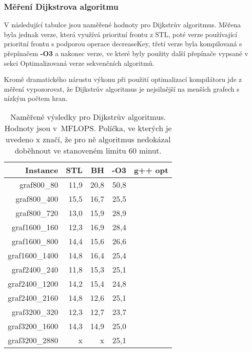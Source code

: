 \documentclass[a4paper,11pt]{article}
\begin{document}
\subsubsection{Měření Dijkstrova algoritmu}
V následující tabulce jsou naměřené hodnoty pro Dijkstrův algoritmus. Mě\-ře\-na byla jednak verze, která využívá prioritní frontu z STL, poté verze používající prioritní frontu s podporou operace decreaseKey, třetí verze byla kompilovaná s pře\-pí\-načem \textbf{-O3} a nakonec verze, ve které byly použity další pře\-pí\-nače vypsané v sekci Optimalizovaná verze sekvenčních algoritmů.
\par
Kromě dramatického nárustu výkonu při použití optimalizací kom\-pi\-látoru jde z měření vypozorovat, že Dijkstrův algoritmus je nejsilnější na menších grafech s nízkým počtem hran.
\begin{table}[H]
  \begin{center}
      \begin{tabular}{|r|r|r|r|r|}
      \hline
      Instance  	& STL	  & BH    & -O3	 & g++ opt  \\ \hline
      graf800\_80  	& 11,9  & 20,8	  & 50,8 &          \\ \hline
      graf800\_400     	& 15,5  & 16,7 	  & 25,5 &	    \\ \hline
      graf800\_720  	& 13,0  & 15,9 	  & 28,9 &	    \\ \hline
      graf1600\_160    	& 12,3  & 16,9 	  & 28,4 &	    \\ \hline
      graf1600\_800  	& 14,4  & 15,6 	  & 26,6 &	    \\ \hline
      graf1600\_1400   	& 14,8  & 16,4 	  & 25,4 &	    \\ \hline
      graf2400\_240  	& 11,8  & 15,3	  & 25,1 &          \\ \hline
      graf2400\_1200   	& 14,2  & 15,4	  & 24,8 &          \\ \hline
      graf2400\_2160  	& 14,8  & 12,6	  & 25,1 &          \\ \hline
      graf3200\_320    	& 12,3  & 12,7	  & 23,7 &          \\ \hline
      graf3200\_1600  	& 14,3  & 14,9	  & 25,0 &          \\ \hline
      graf3200\_2880   	& x    	& x 	  & 25,1 &          \\ \hline
      \end{tabular}
  \caption{Naměřené výsledky pro Dijkstrův algoritmus. Hodnoty jsou v~MFLOPS. Políčka, ve kterých je uvedeno x značí, že pro ně algoritmus nedokázal doběhnout ve stanoveném limitu 60 minut.}
  \label{tab:dijkstra1}
  \end{center}
\end{table}
\end{document}
